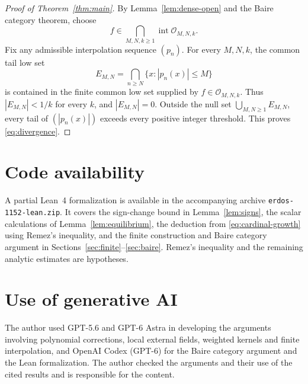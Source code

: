 \documentclass[11pt]{article}
\theoremstyle{definition}
\numberwithin{equation}{section}
\begin{document}
\begin{proof}[Proof of Theorem~\ref{thm:main}]
By Lemma~\ref{lem:dense-open} and the Baire category theorem, choose
\[
 f\in\bigcap_{M,N,k\ge1}\operatorname{int}\mathcal O_{M,N,k}.
\]
Fix any admissible interpolation sequence \((p_n)\).
For every \(M,N,k\), the common tail low set
\[
 E_{M,N}=\bigcap_{n\ge N}\{x:|p_n(x)|\le M\}
\]
is contained in the finite common low set supplied by
\(f\in\mathcal O_{M,N,k}\). Thus \(|E_{M,N}|<1/k\) for every
\(k\), and \(|E_{M,N}|=0\).
Outside the null set \(\bigcup_{M,N\ge1}E_{M,N}\), every tail
of \((|p_n(x)|)\) exceeds every positive integer threshold.
This proves \eqref{eq:divergence}.
\end{proof}

\section*{Code availability}

A partial Lean~4 formalization is available
in the accompanying archive
\texttt{erdos-1152-lean.zip}.
It covers the sign-change bound in Lemma~\ref{lem:signs}, the scalar
calculations of Lemma~\ref{lem:equilibrium}, the deduction from
\eqref{eq:cardinal-growth} using Remez's inequality, and the finite
construction and Baire category argument in
Sections~\ref{sec:finite}--\ref{sec:baire}.
Remez's inequality and the remaining analytic estimates are hypotheses.

\section*{Use of generative AI}

The author used GPT-5.6 and GPT-6 Astra in developing the arguments
involving polynomial corrections, local external fields, weighted kernels
and finite interpolation, and OpenAI Codex (GPT-6) for the Baire category
argument and the Lean formalization. The author checked the arguments and
their use of the cited results and is responsible for the content.
\end{document}
